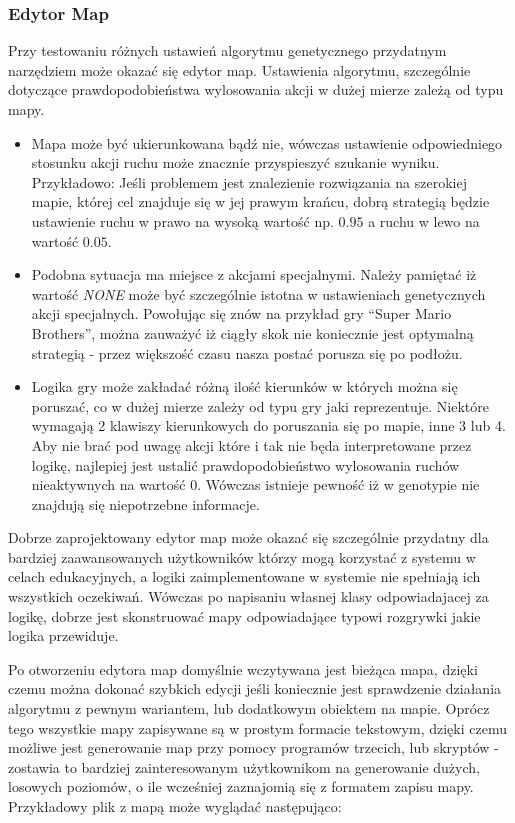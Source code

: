 \subsubsection{Edytor Map}
\begin{par}
Przy testowaniu różnych ustawień algorytmu genetycznego przydatnym narzędziem może okazać się edytor map. 
Ustawienia algorytmu, szczególnie dotyczące prawdopodobieństwa wylosowania akcji w dużej mierze zależą od typu mapy. 
\begin{itemize}
\item 
Mapa może być ukierunkowana bądź nie, wówczas ustawienie odpowiedniego stosunku akcji ruchu może znacznie przyspieszyć szukanie wyniku. Przykładowo: Jeśli problemem jest znalezienie rozwiązania na szerokiej mapie, której cel znajduje się w jej prawym krańcu, dobrą strategią będzie ustawienie ruchu w prawo na wysoką wartość np. $0.95$ a ruchu w lewo na wartość $0.05$.
\item
Podobna sytuacja ma miejsce z akcjami specjalnymi. 
Należy pamiętać iż wartość \textit{NONE} może być szczególnie istotna w ustawieniach genetycznych akcji specjalnych.
Powołując się znów na przykład gry ``Super Mario Brothers'', można zauważyć iż ciągły skok nie koniecznie jest optymalną strategią - przez większość czasu nasza postać porusza się po podłożu.
\item 
Logika gry może zakładać różną ilość kierunków w których można się poruszać, co w dużej mierze zależy od typu gry jaki reprezentuje.
Niektóre wymagają 2 klawiszy kierunkowych do poruszania się po mapie, inne 3 lub 4. 
Aby nie brać pod uwagę akcji które i tak nie będa interpretowane przez logikę, najlepiej jest ustalić prawdopodobieństwo wylosowania ruchów nieaktywnych na wartość $0$. 
Wówczas istnieje pewność iż w genotypie nie znajdują się niepotrzebne informacje.
\end{itemize}

Dobrze zaprojektowany edytor map może okazać się szczególnie przydatny dla bardziej zaawansowanych użytkowników którzy mogą korzystać z systemu w celach edukacyjnych, a logiki zaimplementowane w systemie nie spełniają ich wszystkich oczekiwań.
Wówczas po napisaniu własnej klasy odpowiadajacej za logikę, dobrze jest skonstruować mapy odpowiadające typowi rozgrywki jakie logika przewiduje.

\begin{par}
	Po otworzeniu edytora map domyślnie wczytywana jest bieżąca mapa, dzięki czemu można dokonać szybkich edycji jeśli koniecznie jest sprawdzenie działania algorytmu z pewnym wariantem, lub dodatkowym obiektem na mapie.
	Oprócz tego wszystkie mapy zapisywane są w prostym formacie tekstowym, dzięki czemu możliwe jest generowanie map przy pomocy programów trzecich, lub skryptów - zostawia to bardziej zainteresowanym użytkownikom na generowanie dużych, losowych poziomów, o ile wcześniej zaznajomią się z formatem zapisu mapy.
	Przykładowy plik z mapą może wyglądać następująco:
	

\end{par}
\end{par}
